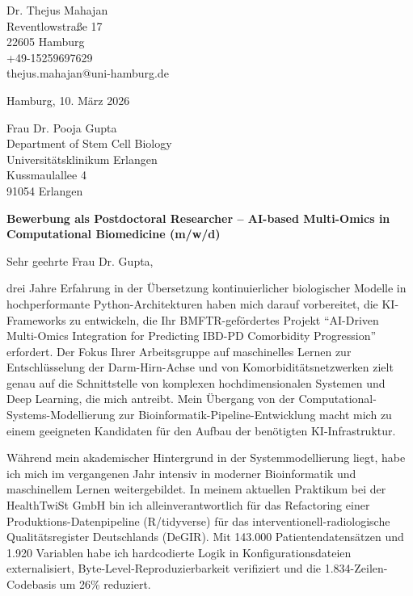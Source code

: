 \documentclass[9pt, a4paper]{extarticle}
\begin{document}
\pagestyle{empty}

\begin{flushleft}
Dr. Thejus Mahajan\\
Reventlowstra{\ss}e 17\\
22605 Hamburg\\
+49-15259697629\\
thejus.mahajan@uni-hamburg.de
\end{flushleft}

\vspace{0.3cm}

\begin{flushright}
Hamburg, 10. M\"arz 2026
\end{flushright}

\vspace{0.3cm}

\begin{flushleft}
Frau Dr. Pooja Gupta\\
Department of Stem Cell Biology\\
Universit\"atsklinikum Erlangen\\
Kussmaulallee 4\\
91054 Erlangen
\end{flushleft}

\vspace{0.3cm}

\textbf{Bewerbung als Postdoctoral Researcher -- AI-based Multi-Omics in Computational Biomedicine (m/w/d)}

\vspace{0.2cm}

Sehr geehrte Frau Dr. Gupta,

drei Jahre Erfahrung in der \"Ubersetzung kontinuierlicher biologischer Modelle in hochperformante Python-Architekturen haben mich darauf vorbereitet, die KI-Frameworks zu entwickeln, die Ihr BMFTR-gef\"ordertes Projekt "`AI-Driven Multi-Omics Integration for Predicting IBD-PD Comorbidity Progression"' erfordert. Der Fokus Ihrer Arbeitsgruppe auf maschinelles Lernen zur Entschl\"usselung der Darm-Hirn-Achse und von Komorbidit\"atsnetzwerken zielt genau auf die Schnittstelle von komplexen hochdimensionalen Systemen und Deep Learning, die mich antreibt. Mein \"Ubergang von der Computational-Systems-Modellierung zur Bioinformatik-Pipeline-Entwicklung macht mich zu einem geeigneten Kandidaten f\"ur den Aufbau der ben\"otigten KI-Infrastruktur.

W\"ahrend mein akademischer Hintergrund in der Systemmodellierung liegt, habe ich mich im vergangenen Jahr intensiv in moderner Bioinformatik und maschinellem Lernen weitergebildet. In meinem aktuellen Praktikum bei der HealthTwiSt GmbH bin ich alleinverantwortlich f\"ur das Refactoring einer Produktions-Datenpipeline (R/tidyverse) f\"ur das interventionell-radiologische Qualit\"atsregister Deutschlands (DeGIR). Mit 143.000 Patientendatens\"atzen und 1.920 Variablen habe ich hardcodierte Logik in Konfigurationsdateien externalisiert, Byte-Level-Reproduzierbarkeit verifiziert und die 1.834-Zeilen-Codebasis um 26\% reduziert.
\end{document}
